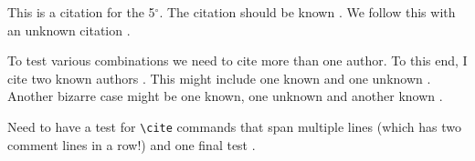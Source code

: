 \documentclass{article}
\renewcommand{\deg}{\ensuremath{^\circ}} %
\begin{document}
This is a citation for the 5\deg. The citation should be known \cite{known}.
We follow this with an unknown citation \cite{unknown}.

To test various combinations we need to cite more than one author.  To this
end, I cite two known authors \cite{known,known2}.  This might include one
known and one unknown \cite{unknown,known}.  Another bizarre case might be
one known, one unknown and another known \cite{known,unknown,known2}.

Need to have a test for \verb#\cite# commands that span multiple lines \cite{
known,%
known2} (which has two comment lines in a row!) and one final test \cite{%
known, %
known2%
}.



\end{document}
